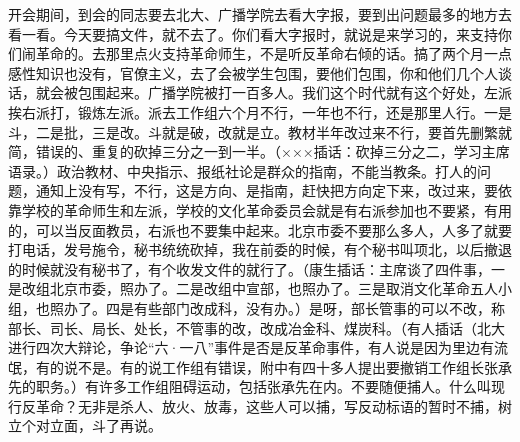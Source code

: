 开会期间，到会的同志要去北大、广播学院去看大字报，要到出问题最多的地方去看一看。今天要搞文件，就不去了。你们看大字报时，就说是来学习的，来支持你们闹革命的。去那里点火支持革命师生，不是听反革命右倾的话。搞了两个月一点感性知识也没有，官僚主义，去了会被学生包围，要他们包围，你和他们几个人谈话，就会被包围起来。广播学院被打一百多人。我们这个时代就有这个好处，左派挨右派打，锻炼左派。派去工作组六个月不行，一年也不行，还是那里人行。一是斗，二是批，三是改。斗就是破，改就是立。教材半年改过来不行，要首先删繁就简，错误的、重复的砍掉三分之一到一半。（×××插话：砍掉三分之二，学习主席语录。）政治教材、中央指示、报纸社论是群众的指南，不能当教条。打人的问题，通知上没有写，不行，这是方向、是指南，赶快把方向定下来，改过来，要依靠学校的革命师生和左派，学校的文化革命委员会就是有右派参加也不要紧，有用的，可以当反面教员，右派也不要集中起来。北京市委不要那么多人，人多了就要打电话，发号施令，秘书统统砍掉，我在前委的时候，有个秘书叫项北，以后撤退的时候就没有秘书了，有个收发文件的就行了。（康生插话：主席谈了四件事，一是改组北京市委，照办了。二是改组中宣部，也照办了。三是取消文化革命五人小组，也照办了。四是有些部门改成科，没有办。）是呀，部长管事的可以不改，称部长、司长、局长、处长，不管事的改，改成冶金科、煤炭科。（有人插话（北大进行四次大辩论，争论“六·一八”事件是否是反革命事件，有人说是因为里边有流氓，有的说不是。有的说工作组有错误，附中有四十多人提出要撤销工作组长张承先的职务。）有许多工作组阻碍运动，包括张承先在内。不要随便捕人。什么叫现行反革命？无非是杀人、放火、放毒，这些人可以捕，写反动标语的暂时不捕，树立个对立面，斗了再说。

